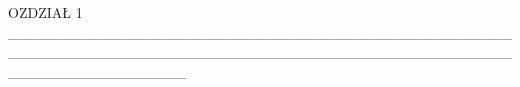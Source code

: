 \documentclass[12pt, a4paper]{report} %
\begin{document}
OZDZIAŁ 1 _________________________________________________________________________________________________________________













\listoffigures
\appendix
\end{document}
